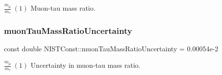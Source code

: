 $\frac{m_\mu}{m_\tau} \ (1)$ Muon-\/tau mass ratio. \mbox{\label{group___n_i_s_t_const-_muon_gacb8e714cc816309192bb37387da5fa6b}} 
\subsubsection{\texorpdfstring{muon\+Tau\+Mass\+Ratio\+Uncertainty}{muonTauMassRatioUncertainty}}
{\footnotesize\ttfamily const double N\+I\+S\+T\+Const\+::muon\+Tau\+Mass\+Ratio\+Uncertainty = 0.\+00054e-\/2}

$\frac{m_\mu}{m_\tau} \ (1)$ Uncertainty in muon-\/tau mass ratio. 